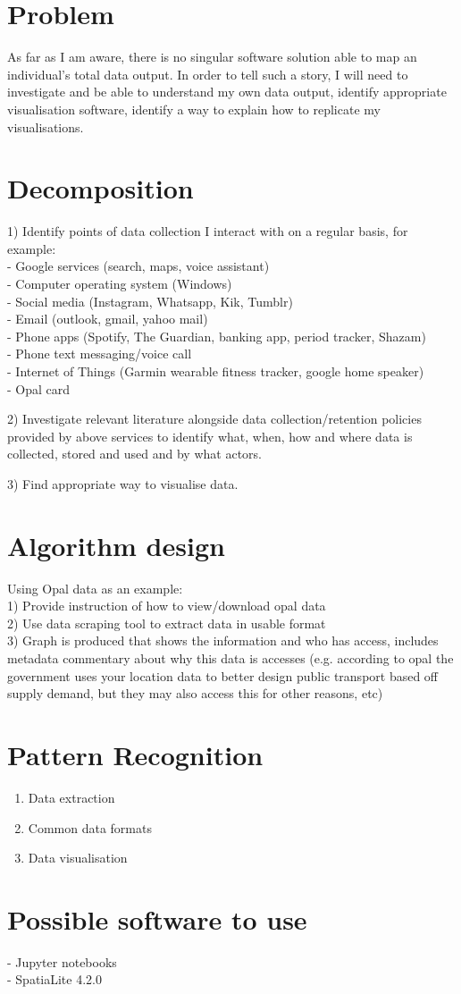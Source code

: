 \documentclass{article}
\begin{document}
\section{Problem}
As far as I am aware, there is no singular software solution able to map an individual’s total data output. In order to tell such a story, I will need to investigate and be able to understand my own data output, identify appropriate visualisation software, identify a way to explain how to replicate my visualisations. 

\section{Decomposition} 
1)	Identify points of data collection I interact with on a regular basis, for example:\\
-	Google services (search, maps, voice assistant)\\
-	Computer operating system (Windows) \\
-	Social media (Instagram, Whatsapp, Kik, Tumblr)\\
-	Email (outlook, gmail, yahoo mail)\\
-	Phone apps (Spotify, The Guardian, banking app, period tracker, Shazam)\\
-	Phone text messaging/voice call\\
-	Internet of Things (Garmin wearable fitness tracker, google home speaker)\\
-	Opal card

2)	Investigate relevant literature alongside data collection/retention policies provided by above services to identify what, when, how and where data is collected, stored and used and by what actors.

3)	Find appropriate way to visualise data.

\section{Algorithm design}
Using Opal data as an example:\\
1) Provide instruction of how to view/download opal data\\
2) Use data scraping tool to extract data in usable format\\
3) Graph is produced that shows the information and who has access, includes metadata commentary about why this data is accesses (e.g. according to opal the government uses your location data to better design public transport based off supply demand, but they may also access this for other reasons, etc) 

\section{Pattern Recognition}
\begin{enumerate}
    \item Data extraction
    \item Common data formats
    \item Data visualisation 
\end{enumerate}

\section{Possible software to use}
- Jupyter notebooks\\
- SpatiaLite 4.2.0 
\end{document}
